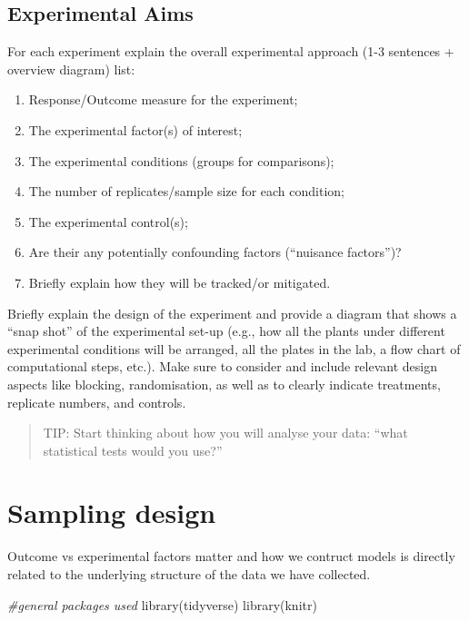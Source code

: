 \documentclass[
]{book}
\newenvironment{Shaded}{\begin{snugshade}}{\end{snugshade}}
\newcommand{\CommentTok}[1]{\textcolor[rgb]{0.56,0.35,0.01}{\textit{#1}}}
\newcommand{\FunctionTok}[1]{\textcolor[rgb]{0.00,0.00,0.00}{#1}}
\newcommand{\NormalTok}[1]{#1}
\providecommand{\tightlist}{%
  \setlength{\itemsep}{0pt}\setlength{\parskip}{0pt}}
\begin{document}
\hypertarget{experimental-aims}{%
\section{Experimental Aims}\label{experimental-aims}}

For each experiment explain the overall experimental approach (1-3 sentences + overview diagram) list:

\begin{enumerate}
\def\labelenumi{\arabic{enumi})}
\tightlist
\item
  Response/Outcome measure for the experiment;
\item
  The experimental factor(s) of interest;
\item
  The experimental conditions (groups for comparisons);
\item
  The number of replicates/sample size for each condition;
\item
  The experimental control(s);
\item
  Are their any potentially confounding factors (``nuisance factors'')?
\item
  Briefly explain how they will be tracked/or mitigated.
\end{enumerate}

Briefly explain the design of the experiment and provide a diagram that shows a ``snap shot'' of the experimental set-up (e.g., how all the plants under different experimental conditions will be arranged, all the plates in the lab, a flow chart of computational steps, etc.). Make sure to consider and include relevant design aspects like blocking, randomisation, as well as to clearly indicate treatments, replicate numbers, and controls.

\begin{quote}
TIP: Start thinking about how you will analyse your data: ``what statistical tests would you use?''
\end{quote}

\hypertarget{sampling-design}{%
\chapter{Sampling design}\label{sampling-design}}

Outcome vs experimental factors matter and how we contruct models is directly related to the underlying structure of the data we have collected.

\begin{Shaded}
\begin{Highlighting}[]
\CommentTok{\#general packages used}
\FunctionTok{library}\NormalTok{(tidyverse)}
\FunctionTok{library}\NormalTok{(knitr)}
\end{Highlighting}
\end{Shaded}
\end{document}
